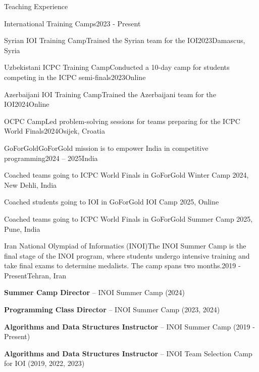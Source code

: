 
\begin{section}{Teaching Experience}

    \begin{subsectionnobullet}{International Training Camps}{}{2023 - Present}{}
    \end{subsectionnobullet}

    \begin{subsectionnobullet}{Syrian IOI Training Camp}{Trained the Syrian team for the IOI}{2023}{Damascus, Syria}
    \end{subsectionnobullet}

    \begin{subsectionnobullet}{Uzbekistani ICPC Training Camp}{Conducted a 10-day camp for students competing in the ICPC semi-finals}{2023}{Online}
    \end{subsectionnobullet}

    \begin{subsectionnobullet}{Azerbaijani IOI Training Camp}{Trained the Azerbaijani team for the IOI}{2024}{Online}
    \end{subsectionnobullet}

    \begin{subsectionnobullet}{OCPC Camp}{Led problem-solving sessions for teams preparing for the ICPC World Finals}{2024}{Osijek, Croatia}
    \end{subsectionnobullet}

    \begin{subsectionnobullet}{GoForGold}{GoForGold mission is to empower India in competitive programming}{2024 -- 2025}{India}
    \item Coached teams going to ICPC World Finals in GoForGold Winter Camp 2024, New Dehli, India
    \item Coached students going to IOI in GoForGold IOI Camp 2025, Online
    \item Coached teams going to ICPC World Finals in GoForGold Summer Camp 2025, Pune, India
    \end{subsectionnobullet}

  \vspace{0.5cm}

  \begin{subsection}{Iran National Olympiad of Informatics (INOI)}{The INOI Summer Camp is the final stage of the INOI program, where students undergo intensive training and take final exams to determine medalists. The camp spans two months.}{2019 - Present}{Tehran, Iran}
    \item \textbf{Summer Camp Director} – INOI Summer Camp (2024)
    \item \textbf{Programming Class Director} – INOI Summer Camp (2023, 2024)
    \item \textbf{Algorithms and Data Structures Instructor} – INOI Summer Camp (2019 - Present)
    \item \textbf{Algorithms and Data Structures Instructor} – INOI Team Selection Camp for IOI (2019, 2022, 2023)
  \end{subsection}


\end{section}
